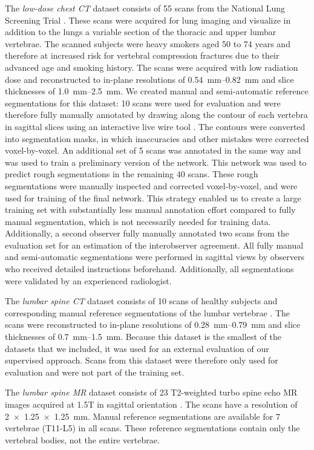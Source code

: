 \documentclass[authoryear,5p,final,times]{elsarticle}
\begin{document}
    The \emph{low-dose chest CT} dataset consists of 55 scans from the National Lung Screening Trial \citep{NLST2011}. These scans were acquired for lung imaging and visualize in addition to the lungs a variable section of the thoracic and upper lumbar vertebrae. The scanned subjects were heavy smokers aged 50 to 74 years and therefore at increased risk for vertebral compression fractures due to their advanced age and smoking history. The scans were acquired with low radiation dose and reconstructed to in-plane resolutions of \SIrange{0.54}{0.82}{\milli\meter} and slice thicknesses of \SIrange{1.0}{2.5}{\milli\meter}. We created manual and semi-automatic reference segmentations for this dataset: 10 scans were used for evaluation and were therefore fully manually annotated by drawing along the contour of each vertebra in sagittal slices using an interactive live wire tool \citep{Barrett1997}. The contours were converted into segmentation masks, in which inaccuracies and other mistakes were corrected voxel-by-voxel. An additional set of 5 scans was annotated in the same way and was used to train a preliminary version of the network. This network was used to predict rough segmentations in the remaining 40 scans. These rough segmentations were manually inspected and corrected voxel-by-voxel, and were used for training of the final network. This strategy enabled us to create a large training set with substantially less manual annotation effort compared to fully manual segmentation, which is not necessarily needed for training data. Additionally, a second observer fully manually annotated two scans from the evaluation set for an estimation of the interobserver agreement. All fully manual and semi-automatic segmentations were performed in sagittal views by observers who received detailed instructions beforehand. Additionally, all segmentations were validated by an experienced radiologist.
    
    The \emph{lumbar spine CT} dataset consists of 10 scans of healthy subjects and corresponding manual reference segmentations of the lumbar vertebrae \citep{Ibragimov2014,Korez2015}. The scans were reconstructed to in-plane resolutions of \SIrange{0.28}{0.79}{\milli\meter} and slice thicknesses of \SIrange{0.7}{1.5}{\milli\meter}. Because this dataset is the smallest of the datasets that we included, it was used for an external evaluation of our supervised approach. Scans from this dataset were therefore only used for evaluation and were not part of the training set.
    
    The \emph{lumbar spine MR} dataset consists of 23 T2-weighted turbo spine echo MR images acquired at 1.5T in sagittal orientation \citep{Chu2015}. The scans have a resolution of \SI[allow-number-unit-breaks]{2x1.25x1.25}{\milli\meter}. Manual reference segmentations are available for 7 vertebrae (T11-L5) in all scans. These reference segmentations contain only the vertebral bodies, not the entire vertebrae.
    
\end{document}
